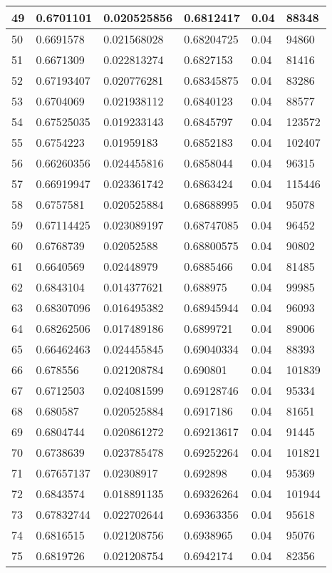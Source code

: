 \begin{longtable}{|l|l|l|l|l|l|}
49 & 0.6701101 & 0.020525856 & 0.6812417 & 0.04 & 88348 \\ \hline 
50 & 0.6691578 & 0.021568028 & 0.68204725 & 0.04 & 94860 \\ \hline 
51 & 0.6671309 & 0.022813274 & 0.6827153 & 0.04 & 81416 \\ \hline 
52 & 0.67193407 & 0.020776281 & 0.68345875 & 0.04 & 83286 \\ \hline 
53 & 0.6704069 & 0.021938112 & 0.6840123 & 0.04 & 88577 \\ \hline 
54 & 0.67525035 & 0.019233143 & 0.6845797 & 0.04 & 123572 \\ \hline 
55 & 0.6754223 & 0.01959183 & 0.6852183 & 0.04 & 102407 \\ \hline 
56 & 0.66260356 & 0.024455816 & 0.6858044 & 0.04 & 96315 \\ \hline 
57 & 0.66919947 & 0.023361742 & 0.6863424 & 0.04 & 115446 \\ \hline 
58 & 0.6757581 & 0.020525884 & 0.68688995 & 0.04 & 95078 \\ \hline 
59 & 0.67114425 & 0.023089197 & 0.68747085 & 0.04 & 96452 \\ \hline 
60 & 0.6768739 & 0.02052588 & 0.68800575 & 0.04 & 90802 \\ \hline 
61 & 0.6640569 & 0.02448979 & 0.6885466 & 0.04 & 81485 \\ \hline 
62 & 0.6843104 & 0.014377621 & 0.688975 & 0.04 & 99985 \\ \hline 
63 & 0.68307096 & 0.016495382 & 0.68945944 & 0.04 & 96093 \\ \hline 
64 & 0.68262506 & 0.017489186 & 0.6899721 & 0.04 & 89006 \\ \hline 
65 & 0.66462463 & 0.024455845 & 0.69040334 & 0.04 & 88393 \\ \hline 
66 & 0.678556 & 0.021208784 & 0.690801 & 0.04 & 101839 \\ \hline 
67 & 0.6712503 & 0.024081599 & 0.69128746 & 0.04 & 95334 \\ \hline 
68 & 0.680587 & 0.020525884 & 0.6917186 & 0.04 & 81651 \\ \hline 
69 & 0.6804744 & 0.020861272 & 0.69213617 & 0.04 & 91445 \\ \hline 
70 & 0.6738639 & 0.023785478 & 0.69252264 & 0.04 & 101821 \\ \hline 
71 & 0.67657137 & 0.02308917 & 0.692898 & 0.04 & 95369 \\ \hline 
72 & 0.6843574 & 0.018891135 & 0.69326264 & 0.04 & 101944 \\ \hline 
73 & 0.67832744 & 0.022702644 & 0.69363356 & 0.04 & 95618 \\ \hline 
74 & 0.6816515 & 0.021208756 & 0.6938965 & 0.04 & 95076 \\ \hline 
75 & 0.6819726 & 0.021208754 & 0.6942174 & 0.04 & 82356 \\ \hline 
\end{longtable}